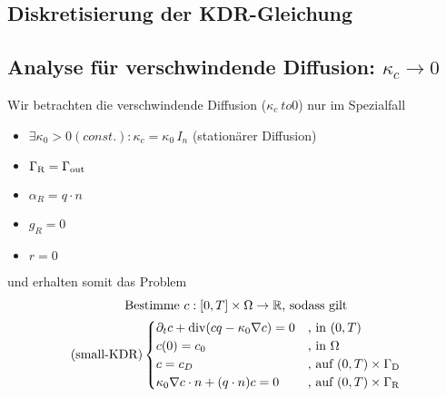 \subsection{Diskretisierung der KDR-Gleichung}

\subsection{Analyse für verschwindende Diffusion: $ \kappa_c \to 0 $}
\label{Analyse für verschwindende Diffusion}
Wir betrachten die verschwindende Diffusion ($ \kappa_c \ to 0 $) nur im Spezialfall
\begin{itemize}
	\item  $ \exists \kappa_0 > 0 (const.): \kappa_c = \kappa_0 \, I_n $ (stationärer Diffusion)
	\item $ \Gamma_{\text{R}} = \Gamma_{{\text{out}}} $
	\item $ \alpha_R = q \cdot n $
	\item $ g_R = 0 $
	\item $ r = 0 $
\end{itemize}
und erhalten somit das Problem
\begin{gather*}
	\text{Bestimme }  c:[0,T] \times \Omega \to \R \text{, sodass gilt}\\
	\sDKDR\begin{cases}
		\partial_t c + \dive(c q - \kappa_0 \nabla c) = 0 &\text{, in } (0,T) \time \Omega\\
		c(0) = c_0  &\text{, in } \Omega\\
		c = c_D &\text{, auf } (0,T) \times \GammaD \\
		\kappa_0 \nabla c \cdot n + (q \cdot n) c = 0 &\text{, auf } (0,T) \times \GammaR
	\end{cases}
\end{gather*}

